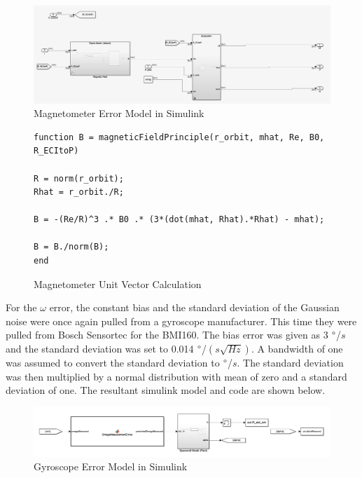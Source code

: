 \begin{figure}[H]
    \centering
    \captionsetup{ justification = centering }
    \includegraphics[width = 15cm]{Images/PS7/magnetometerErrorSimulink.png}
    \caption{Magnetometer Error Model in Simulink}
    \label{fig:magnetometerErrorSimulink}
\end{figure}

\begin{figure} [H]
    \centering
    \begin{lstlisting}
function B = magneticFieldPrinciple(r_orbit, mhat, Re, B0, R_ECItoP)

R = norm(r_orbit);
Rhat = r_orbit./R;

B = -(Re/R)^3 .* B0 .* (3*(dot(mhat, Rhat).*Rhat) - mhat);

B = B./norm(B);
end
    \end{lstlisting}
    \caption{Magnetometer Unit Vector Calculation}
    \label{fig:magnetometerNoise}
\end{figure}

For the $\omega$ error, the constant bias and the standard deviation of the Gaussian noise were once again pulled from a gyroscope manufacturer. This time they were pulled from Bosch Sensortec for the BMI160. The bias error was given as 3 $\degree$/$s$ and the standard deviation was set to  0.014 $\degree$/$\left(s \sqrt{Hz}\right)$. A bandwidth of one was assumed to convert the standard deviation to $\degree$/$s$. The standard deviation was then multiplied by a normal distribution with mean of zero and a standard deviation of one. The resultant simulink model and code are shown below.

\begin{figure}[H]
    \centering
    \captionsetup{ justification = centering }
    \includegraphics[width = 15cm]{Images/PS7/GyroErrorSimulink.png}
    \caption{Gyroscope Error Model in Simulink}
    \label{fig:gyroErrorSimulink}
\end{figure}

